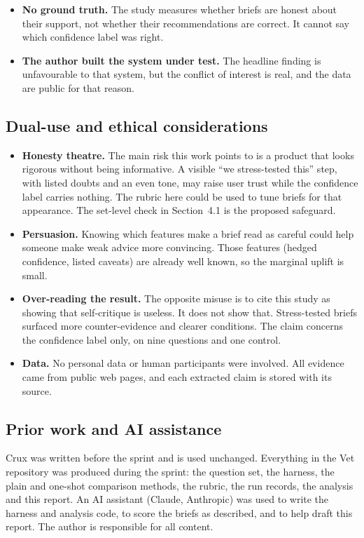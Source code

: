 \documentclass[11pt]{article}
\newcommand{\crux}{Crux}
\begin{document}
\begin{itemize}
\item \textbf{No ground truth.} The study measures whether briefs are honest about their support, not whether their recommendations are correct. It cannot say which confidence label was right.
\item \textbf{The author built the system under test.} The headline finding is unfavourable to that system, but the conflict of interest is real, and the data are public for that reason.
\end{itemize}

\subsection*{Dual-use and ethical considerations}

\begin{itemize}
\item \textbf{Honesty theatre.} The main risk this work points to is a product that looks rigorous without being informative. A visible ``we stress-tested this'' step, with listed doubts and an even tone, may raise user trust while the confidence label carries nothing. The rubric here could be used to tune briefs for that appearance. The set-level check in Section~4.1 is the proposed safeguard.
\item \textbf{Persuasion.} Knowing which features make a brief read as careful could help someone make weak advice more convincing. Those features (hedged confidence, listed caveats) are already well known, so the marginal uplift is small.
\item \textbf{Over-reading the result.} The opposite misuse is to cite this study as showing that self-critique is useless. It does not show that. Stress-tested briefs surfaced more counter-evidence and clearer conditions. The claim concerns the confidence label only, on nine questions and one control.
\item \textbf{Data.} No personal data or human participants were involved. All evidence came from public web pages, and each extracted claim is stored with its source.
\end{itemize}

\subsection*{Prior work and AI assistance}

\crux{} was written before the sprint and is used unchanged. Everything in the Vet repository was produced during the sprint: the question set, the harness, the plain and one-shot comparison methods, the rubric, the run records, the analysis and this report. An AI assistant (Claude, Anthropic) was used to write the harness and analysis code, to score the briefs as described, and to help draft this report. The author is responsible for all content.
\end{document}
